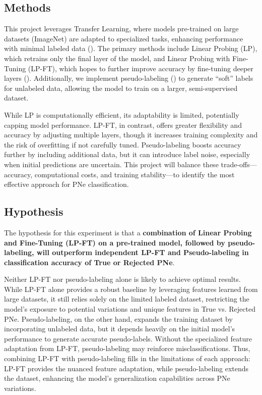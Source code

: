 \documentclass{article}
\begin{document}
\subsection{Methods}

This project leverages Transfer Learning, where models pre-trained on large datasets (ImageNet) are adapted to specialized tasks, enhancing performance with minimal labeled data (\citet{pan2010survey}). The primary methods include Linear Probing (LP), which retrains only the final layer of the model, and  Linear Probing with Fine-Tuning (LP-FT),  which hopes to further improve accuracy by fine-tuning deeper layers (\citet{kumar2022lpft}). Additionally, we implement pseudo-labeling (\citet{lee2013pseudo}) to generate ``soft'' labels for unlabeled data, allowing the model to train on a larger, semi-supervised dataset. 

While LP is computationally efficient, its adaptability is limited, potentially capping model performance. LP-FT, in contrast, offers greater flexibility and accuracy by adjusting multiple layers, though it increases training complexity and the risk of overfitting if not carefully tuned. Pseudo-labeling boosts accuracy further by including additional data, but it can introduce label noise, especially when initial predictions are uncertain. This project will balance these trade-offs---accuracy, computational costs, and training stability---to identify the most effective approach for PNe classification.

\subsection{Hypothesis}

The hypothesis for this experiment is that a \textbf{combination of Linear Probing and Fine-Tuning (LP-FT) on a pre-trained model, followed by pseudo-labeling, will outperform independent LP-FT and Pseudo-labeling in classification accuracy of True or Rejected PNe}. 

Neither LP-FT nor pseudo-labeling alone is likely to achieve optimal results. While LP-FT alone provides a robust baseline by leveraging features learned from large datasets, it still relies solely on the limited labeled dataset, restricting the model's exposure to potential variations and unique features in True vs. Rejected PNe. Pseudo-labeling, on the other hand, expands the training dataset by incorporating unlabeled data, but it depends heavily on the initial model’s performance to generate accurate pseudo-labels. Without the specialized feature adaptation from LP-FT, pseudo-labeling may reinforce misclassifications. Thus, combining LP-FT with pseudo-labeling fills in the limitations of each approach: LP-FT provides the nuanced feature adaptation, while pseudo-labeling extends the dataset, enhancing the model’s generalization capabilities across PNe variations.
\end{document}
